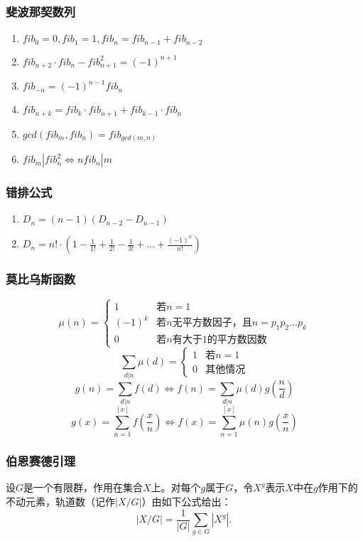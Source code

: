 \documentclass[a4paper]{article}
\begin{document}
\subsubsection{斐波那契数列}

\begin{enumerate}
	\item $fib_0=0, fib_1=1, fib_n=fib_{n-1}+fib_{n-2}$
	\item $fib_{n+2} \cdot fib_n-fib_{n+1}^2=(-1)^{n+1}$
	\item $fib_{-n}=(-1)^{n-1}fib_n$
	\item $fib_{n+k}=fib_k \cdot fib_{n+1}+fib_{k-1} \cdot fib_n$
	\item $gcd(fib_m, fib_n)=fib_{gcd(m, n)}$
	\item $fib_m|fib_n^2\Leftrightarrow nfib_n|m$
\end{enumerate}

\subsubsection{错排公式}

\begin{enumerate}
	\item $D_n = (n-1)(D_{n-2}-D_{n-1})$
	\item $D_n = n! \cdot (1-\frac{1}{1!}+\frac{1}{2!}-\frac{1}{3!}+\ldots+\frac{(-1)^n}{n!})$
\end{enumerate}

\subsubsection{莫比乌斯函数}

$$\mu(n) = \begin{cases}
1 & \text{若}n=1\\
(-1)^k & \text{若}n\text{无平方数因子，且}n = p_1p_2\dots p_k\\
0 & \text{若}n\text{有大于}1\text{的平方数因数}
\end{cases}$$
$$\sum_{d|n}{\mu(d)} = \begin{cases}
1 & \text{若}n=1\\
0 & \text{其他情况}
\end{cases}$$
$$g(n) = \sum_{d|n}{f(d)} \Leftrightarrow f(n) = \sum_{d|n}{\mu(d)g(\frac{n}{d})}$$
$$g(x) = \sum_{n=1}^{[x]}f(\frac{x}{n}) \Leftrightarrow f(x) = \sum_{n=1}^{[x]}{\mu(n)g(\frac{x}{n})}$$

\subsubsection{伯恩赛德引理}
设$G$是一个有限群，作用在集合$X$上。对每个$g$属于$G$，令$X^g$表示$X$中在$g$作用下的不动元素，轨道数（记作$|X/G|$）由如下公式给出：
$$|X/G| = \frac{1}{|G|}\sum_{g \in G}|X^g|.\,$$
\end{document}
